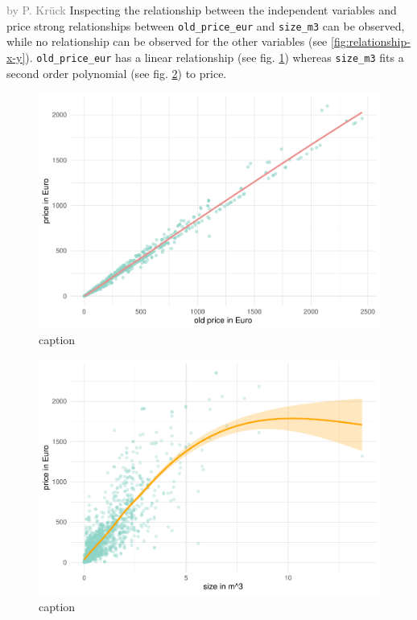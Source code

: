 \documentclass[a4paper, nobind]{templates/ociamthesis}
\begin{document}
\textcolor{gray}{by P. Krück}
Inspecting the relationship between the independent variables and price strong relationships between \texttt{old\_price\_eur} and \texttt{size\_m3} can be observed, while no relationship can be observed for the other variables (see \ref{fig:relationship-x-y}).
\texttt{old\_price\_eur} has a linear relationship (see fig. \ref{fig:relationship-old-price}) whereas \texttt{size\_m3} fits a second order polynomial (see fig. \ref{fig:relationship-size-m3}) to price.

\begin{figure}[!h]
\includegraphics[width=1\linewidth]{_main_files/figure-latex/relationship-old-price-1} \caption{caption}\label{fig:relationship-old-price}
\end{figure}

\begin{figure}[!h]
\includegraphics[width=1\linewidth]{_main_files/figure-latex/relationship-size-m3-1} \caption{caption}\label{fig:relationship-size-m3}
\end{figure}
\end{document}
